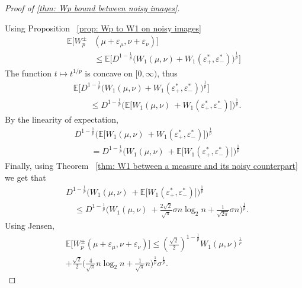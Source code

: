 \documentclass{article}
\theoremstyle{plain}
\theoremstyle{definition}
\theoremstyle{remark}
\begin{document}
\begin{proof}[Proof of \cref{thm: Wp bound between noisy images}]\label{proof: Distance between two noisy images upper bound}

Using Proposition ~\ref{prop: Wp to W1 on noisy images}
\begin{align}
    \mathbb{E}\big[W_p^\pm&(\mu+\varepsilon_\mu,\nu+\varepsilon_\nu)\big]
    \\&\le
    \mathbb{E}\big[D^{1-\frac1p}\big( W_1(\mu,\nu) + W_1(\varepsilon^*_+,\varepsilon^*_-) \big)^{\frac1p}\big] \nonumber
\end{align}
The function $t\mapsto t^{1/p}$ is concave on $[0,\infty)$, thus
\begin{align}
    &\mathbb{E}\big[D^{1-\frac1p}\big( W_1(\mu,\nu) + W_1(\varepsilon^*_+,\varepsilon^*_-) \big)^{\frac1p}\big]
    \\&\qquad\le
    D^{1-\frac1p}\big(\mathbb{E}\big[W_1(\mu,\nu)\ + 
    W_1(\varepsilon^*_+,\varepsilon^*_-) \big]\big)^{\frac1p}. \nonumber
\end{align}
By the linearity of expectation,
\begin{align}
    &D^{1-\frac1p}\big(\mathbb{E}\big[W_1(\mu,\nu)\ + 
    W_1(\varepsilon^*_+,\varepsilon^*_-) \big]\big)^{\frac1p}
    \\&\qquad=
    D^{1-\frac1p}\big(W_1(\mu,\nu)\ + 
    \mathbb{E}\big[W_1(\varepsilon^*_+,\varepsilon^*_-) \big]\big)^{\frac1p} \nonumber
\end{align}
Finally, using Theorem ~\ref{thm: W1 between a measure and its noisy counterpart} we get that
\begin{align}
    &D^{1-\frac1p}\big(W_1(\mu,\nu)\ + 
    \mathbb{E}\big[W_1(\varepsilon^*_+,\varepsilon^*_-) \big]\big)^{\frac1p}
    \\&\quad\le
    D^{1-\frac1p}\bigg(W_1(\mu,\nu)\ + \frac{2\sqrt2}{\sqrt{\pi}}\sigma n\log_2 n+\frac1{\sqrt{2\pi}}\sigma n
    \bigg)^{\frac1p}. \nonumber
\end{align}
Using Jensen, 
\begin{align}
    \mathbb{E}\big[W_p^\pm(\mu+\varepsilon_\mu,\nu+\varepsilon_\nu)\big]
    \le
    (\tfrac{\sqrt2}{2})^{1-\frac1p} W_1(\mu,\nu)^{\frac1p} \nonumber
    \\
    + 
    \tfrac{\sqrt2}{2}\bigg(\tfrac{4}{\sqrt{\pi}} n\log_2 n +
    \tfrac{1}{\sqrt\pi} n 
    \bigg)^{\frac1p}\sigma^{\frac1p}.
\end{align}

\end{proof}
\end{document}
